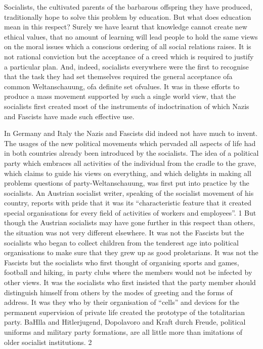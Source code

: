 \documentclass[11pt,openany]{book}
\begin{document}
Socialists, the cultivated parents of the barbarous offspring they have produced, traditionally hope to solve this problem by education. But what does education mean in this respect? Surely we have learnt that knowledge cannot create new ethical values, that no amount of learning will lead people to hold the same views on the moral issues which a conscious ordering of all social relations raises. It is not rational conviction but the acceptance of a creed which is required to justify a particular plan. And, indeed, socialists everywhere were the first to recognise that the task they had set themselves required the general acceptance ofa common Weltanschauung, ofa definite set ofvalues. It was in these efforts to produce a mass movement supported by such a single world view, that the socialists first created most of the instruments of indoctrination of which Nazis and Fascists have made such effective use.

In Germany and Italy the Nazis and Fascists did indeed not have much to invent. The usages of the new political movements which pervaded all aspects of life had in both countries already been introduced by the socialists. The idea of a political party which embraces all activities of the individual from the cradle to the grave, which claims to guide his views on everything, and which delights in making all problems questions of party-Weltanschauung, was first put into practice by the socialists. An Austrian socialist writer, speaking of the socialist movement of his country, reports with pride that it was its ``characteristic feature that it created special organisations for every field of activities of workers and employees''. 1 But though the Austrian socialists may have gone further in this respect than others, the situation was not very different elsewhere. It was not the Fascists but the socialists who began to collect children from the tenderest age into political organisations to make sure that they grew up as good proletarians. It was not the Fascists but the socialists who first thought of organising sports and games, football and hiking, in party clubs where the members would not be infected by other views. It was the socialists who first insisted that the party member should distinguish himself from others by the modes of greeting and the forms of address. It was they who by their organisation of ``cells'' and devices for the permanent supervision of private life created the prototype of the totalitarian party. BaHlla and Hitlerjugend, Dopolavoro and Kraft durch Freude, political uniforms and military party formations, are all little more than imitations of older socialist institutions. 2
\end{document}
